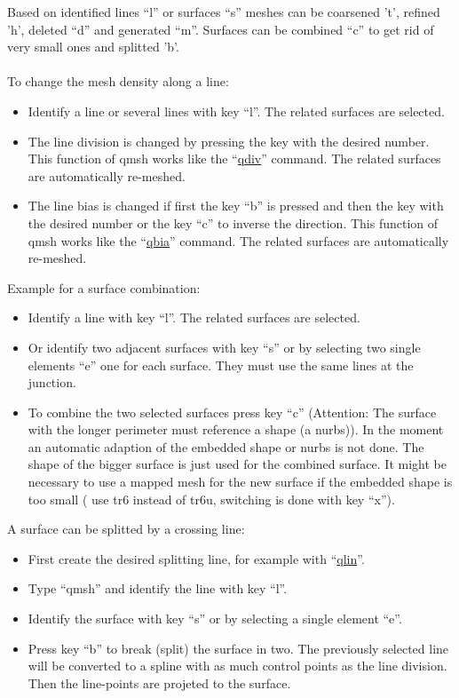 \documentclass{article}
\providecommand{\htmlref}[2]{\hyperref[#2]{#1}}
\begin{document}
Based on identified lines ``l'' or surfaces ``s'' meshes can be coarsened 't', refined 'h', deleted ``d'' and generated ``m''. Surfaces can be combined ``c'' to get rid of very small ones and splitted 'b'.\\\\
To change the mesh density along a line:
\begin{itemize}
\item Identify a line or several lines with key ``l''. The related surfaces are selected.
\item The line division is changed by pressing the key with the desired number. This function of qmsh works like the ``\htmlref{qdiv}{qdiv}'' command. The related surfaces are automatically re-meshed.
\item The line bias is changed if first the key ``b'' is pressed and then the key with the desired number or the key ``c'' to inverse the direction. This function of qmsh works like the ``\htmlref{qbia}{qbia}'' command. The related surfaces are automatically re-meshed.
\end{itemize}
Example for a surface combination:
\begin{itemize}
\item Identify a line with key ``l''. The related surfaces are selected.
\item Or identify two adjacent surfaces with key ``s'' or by selecting two single elements ``e'' one for each surface. They must use the same lines at the junction. 
\item To combine the two selected surfaces press key ``c'' (Attention: The surface with the longer perimeter must reference a shape (a nurbs)). In the moment an automatic adaption of the embedded shape or nurbs is not done. The shape of the bigger surface is just used for the combined surface. It might be necessary to use a mapped mesh for the new surface if the embedded shape is too small ( use tr6 instead of tr6u, switching is done with key ``x'').
\end{itemize}
A surface can be splitted by a crossing line:
\begin{itemize}
\item First create the desired splitting line, for example with ``\htmlref{qlin}{qlin}''.
\item Type ``qmsh'' and identify the line with key ``l''.
\item Identify the surface with key ``s'' or by selecting a single element ``e''.
\item Press key ``b'' to break (split) the surface in two. The previously selected line will be converted to a spline with as much control points as the line division. Then the line-points are projeted to the surface.
\end{itemize}
\end{document}
